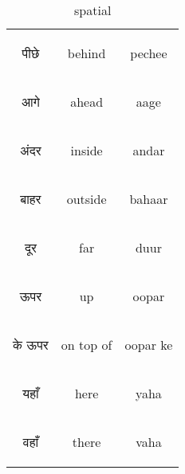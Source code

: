 \begin{table}[H]
    \centering
    \begin{tabular}{c|c|c}        
    \begin{hindi} पीछे \end{hindi} & behind & pechee \\
    \begin{hindi} आगे \end{hindi} & ahead & aage  \\
    \begin{hindi} अंदर \end{hindi} & inside & andar \\
    \begin{hindi} बाहर \end{hindi} & outside & bahaar \\
    \begin{hindi} दूर \end{hindi} & far & duur \\
    \begin{hindi} ऊपर \end{hindi} & up & oopar \\
    \begin{hindi} के ऊपर\end{hindi} & on top of & oopar ke \\
    \begin{hindi} यहाँ \end{hindi} & here & yaha \\
    \begin{hindi} वहाँ \end{hindi} & there & vaha \\
    \end{tabular}    
    \caption{spatial}
    \label{tab:adverbs_spatial}
\end{table}




\newpage 
